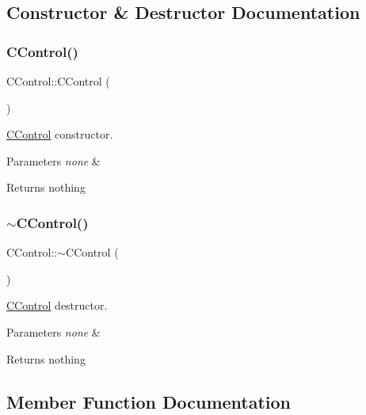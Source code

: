 \subsection{Constructor \& Destructor Documentation}
\hypertarget{class_c_control_a6498500ff403327b5770a3acebed1d93}{}\label{class_c_control_a6498500ff403327b5770a3acebed1d93} 
\subsubsection{\texorpdfstring{C\+Control()}{CControl()}}
{\footnotesize\ttfamily C\+Control\+::\+C\+Control (\begin{DoxyParamCaption}{ }\end{DoxyParamCaption})}



\hyperlink{class_c_control}{C\+Control} constructor. 


\begin{DoxyParams}{Parameters}
{\em none} & \\
\hline
\end{DoxyParams}
\begin{DoxyReturn}{Returns}
nothing 
\end{DoxyReturn}
\hypertarget{class_c_control_ab2ae420ef75b010c0c9078e597781105}{}\label{class_c_control_ab2ae420ef75b010c0c9078e597781105} 
\subsubsection{\texorpdfstring{$\sim$\+C\+Control()}{~CControl()}}
{\footnotesize\ttfamily C\+Control\+::$\sim$\+C\+Control (\begin{DoxyParamCaption}{ }\end{DoxyParamCaption})}



\hyperlink{class_c_control}{C\+Control} destructor. 


\begin{DoxyParams}{Parameters}
{\em none} & \\
\hline
\end{DoxyParams}
\begin{DoxyReturn}{Returns}
nothing 
\end{DoxyReturn}


\subsection{Member Function Documentation}
\hypertarget{class_c_control_a0b4ca36ae9a4b2a1ab98992ab35f2209}{}\label{class_c_control_a0b4ca36ae9a4b2a1ab98992ab35f2209} 
